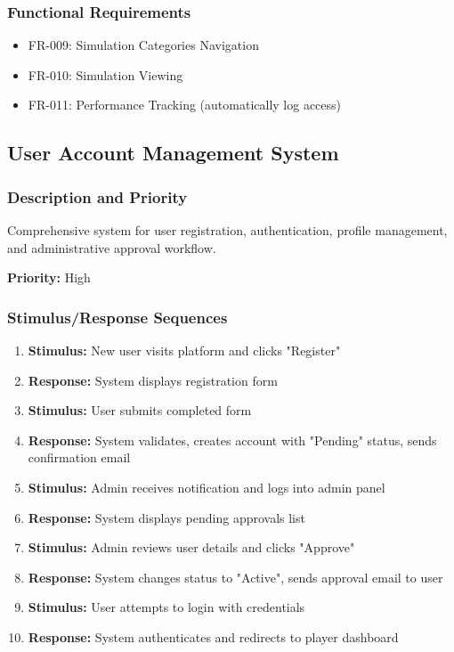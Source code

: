 \documentclass[12pt,a4paper]{article}
\begin{document}
\begin{enumerate}
\subsubsection{Functional Requirements}
\begin{itemize}
    \item FR-009: Simulation Categories Navigation
    \item FR-010: Simulation Viewing
    \item FR-011: Performance Tracking (automatically log access)
\end{itemize}

\subsection{User Account Management System}

\subsubsection{Description and Priority}
Comprehensive system for user registration, authentication, profile management, and administrative approval workflow.

\textbf{Priority:} High

\subsubsection{Stimulus/Response Sequences}
\begin{enumerate}
    \item \textbf{Stimulus:} New user visits platform and clicks "Register"
    \item \textbf{Response:} System displays registration form
    \item \textbf{Stimulus:} User submits completed form
    \item \textbf{Response:} System validates, creates account with "Pending" status, sends confirmation email
    \item \textbf{Stimulus:} Admin receives notification and logs into admin panel
    \item \textbf{Response:} System displays pending approvals list
    \item \textbf{Stimulus:} Admin reviews user details and clicks "Approve"
    \item \textbf{Response:} System changes status to "Active", sends approval email to user
    \item \textbf{Stimulus:} User attempts to login with credentials
    \item \textbf{Response:} System authenticates and redirects to player dashboard
\end{enumerate}


\end{enumerate}
\end{document}
